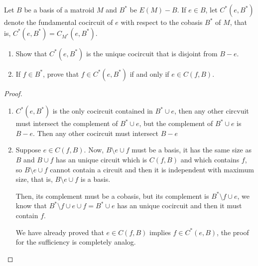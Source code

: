 \prob
{
    Let $B$ be a basis of a matroid $M$ and $B^*$ be $E(M) - B$. If $e\in B$, let $C^*(e, B^*)$ denote the fundamental cocircuit
    of $e$ with respect to the cobasis $B^*$ of $M$, that is, $C^*(e, B^*) = C_{M^*}(e, B^*)$.
    \begin{enumerate}[label=(\roman*)]
        \item Show that $C^*(e,B^*)$ is the unique cocircuit that is disjoint from $B - e$.
        \item If $f \in B^*$, prove that $f \in C^*(e,B^*)$ if and only if $e \in C(f,B)$.
    \end{enumerate}
}
\begin{proof}
    $\,$\pn
    \begin{enumerate}
        \item 
            $C^*(e, B^*)$ is the only cocircuit contained in $B^* \cup e$, then any other circvuit must 
            intersect the complement of $B^* \cup e$, but the complement of $B^* \cup e$ is $B - e$. Then
            any other cocircuit must intersect $B - e$
        \item             
            Suppose $e \in C(f, B)$. Now, $B \setminus e \cup f$ must be a basis, it has the same size
            as $B$ and $B \cup f$ has an unique circuit which is $C(f, B)$ and which contains $f$, 
            so $B \setminus e \cup  f$ cannot contain a circuit and then it is independent with
            maximum size, that is, $B \setminus e \cup  f$ is a basis.\pn
            
            Then, its complement must be a cobasis, but its complement is $B^* \setminus f \cup e$, we know that
            $B^* \setminus f \cup e \cup f = B^* \cup e$ has an unique cocircuit and then it must contain $f$.\pn
            
            We have already proved that $e \in C(f, B)$ implies $f \in C^*(e, B)$, the proof for the sufficiency is
            completely analog.
    \end{enumerate}
\end{proof}